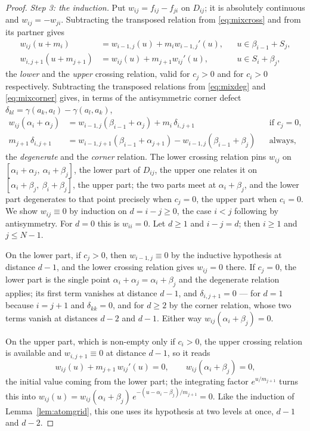 \documentclass[11pt,a4paper]{article}
\theoremstyle{plain}
\theoremstyle{definition}
\theoremstyle{remark}
\begin{document}
\begin{proof}
  \emph{Step 3: the induction.}  Put $w_{ij} = f_{ij} - f_{ji}$ on $D_{ij}$;
  it is absolutely continuous and $w_{ij} = -w_{ji}$.  Subtracting the
  transposed relation from \eqref{eq:mixcross} and from its partner gives
  \begin{align*}
    w_{ij}(u+m_i) &= w_{i-1,j}(u) + m_i w_{i-1,j}'(u) ,
      && u \in \beta_{i-1} + S_j , \\
    w_{i,j+1}(u+m_{j+1}) &= w_{ij}(u) + m_{j+1} w_{ij}'(u) ,
      && u \in S_i + \beta_j ,
  \end{align*}
  the \emph{lower} and the \emph{upper} crossing relation, valid for $c_j > 0$
  and for $c_i > 0$ respectively.  Subtracting the transposed relations from
  \eqref{eq:mixdeg} and \eqref{eq:mixcorner} gives, in terms of the
  antisymmetric corner defect
  $\delta_{kl} = \gamma(a_k,a_l) - \gamma(a_l,a_k)$,
  \begin{align*}
    w_{ij}(\alpha_i + \alpha_j)
      &= w_{i-1,j}(\beta_{i-1} + \alpha_j) + m_i\, \delta_{i,j+1}
      && \text{if } c_j = 0 , \\
    m_{j+1}\, \delta_{i,j+1}
      &= w_{i-1,j+1}(\beta_{i-1}+\alpha_{j+1}) - w_{i-1,j}(\beta_{i-1}+\beta_j)
      && \text{always,}
  \end{align*}
  the \emph{degenerate} and the \emph{corner} relation.  The lower crossing
  relation pins $w_{ij}$ on $[\alpha_i+\alpha_j,\ \alpha_i+\beta_j]$, the lower
  part of $D_{ij}$, the upper one relates it on
  $[\alpha_i+\beta_j,\ \beta_i+\beta_j]$, the upper part; the two parts meet at
  $\alpha_i + \beta_j$, and the lower part degenerates to that point precisely
  when $c_j = 0$, the upper part when $c_i = 0$.  We show
  $w_{ij} \equiv 0$ by induction on $d = i - j \geq 0$, the case $i < j$
  following by antisymmetry.  For $d = 0$ this is $w_{ii} = 0$.  Let $d \geq 1$
  and $i - j = d$; then $i \geq 1$ and $j \leq N-1$.

  On the lower part, if $c_j > 0$, then $w_{i-1,j} \equiv 0$ by the inductive
  hypothesis at distance $d-1$, and the lower crossing relation gives
  $w_{ij} = 0$ there.  If $c_j = 0$, the lower part is the single point
  $\alpha_i + \alpha_j = \alpha_i + \beta_j$ and the degenerate relation applies;
  its first term vanishes at distance $d-1$, and $\delta_{i,j+1} = 0$ --- for
  $d = 1$ because $i = j+1$ and $\delta_{kk} = 0$, and for $d \geq 2$ by the
  corner relation, whose two terms vanish at distances $d-2$ and $d-1$.  Either
  way $w_{ij}(\alpha_i+\beta_j) = 0$.

  On the upper part, which is non-empty only if $c_i > 0$, the upper crossing
  relation is available and $w_{i,j+1} \equiv 0$ at distance $d-1$, so it reads
  \[
    w_{ij}(u) + m_{j+1}\, w_{ij}'(u) = 0 , \qquad
    w_{ij}(\alpha_i + \beta_j) = 0 ,
  \]
  the initial value coming from the lower part; the integrating factor
  $e^{u/m_{j+1}}$ turns this into
  $w_{ij}(u) = w_{ij}(\alpha_i+\beta_j)\, e^{-(u - \alpha_i - \beta_j)/m_{j+1}} = 0$.
  Like the induction of Lemma~\ref{lem:atomgrid}, this one uses its hypothesis at
  two levels at once, $d-1$ and $d-2$.


\end{proof}
\end{document}
